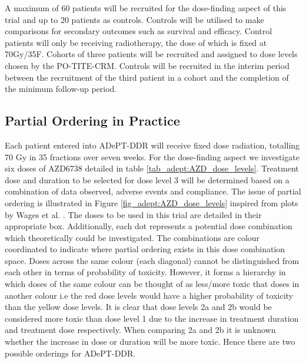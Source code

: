 A maximum of 60 patients will be recruited for the dose-finding aspect of this trial and up to 20 patients as controls. Controls will be utilised to make comparisons for secondary outcomes such as survival and efficacy. Control patients will only be receiving radiotherapy, the dose of which is fixed at 70Gy/35F. Cohorts of three patients will be recruited and assigned to dose levels chosen by the PO-TITE-CRM. Controls will be recruited in the interim period between the recruitment of the third patient in a cohort and the completion of the minimum follow-up period.    

\subsection{Partial Ordering in Practice}
\label{adept:Partial-ordering-in-practice}%

Each patient entered into ADePT-DDR will receive fixed dose radiation, totalling 70 Gy in 35 fractions over seven weeks. For the dose-finding aspect we investigate six doses of AZD6738 detailed in table \ref{tab_adept:AZD_dose_levels}. Treatment dose and duration to be selected for dose level 3 will be determined based on a combination of data observed, adverse events and compliance. The issue of partial ordering is illustrated in Figure \ref{fig_adept:AZD_dose_levels} inspired from plots by Wages et al. \cite{wagesUsingTimetoeventContinual2013}. The doses to be used in this trial are detailed in their appropriate box. Additionally, each dot represents a potential dose combination which theoretically could be investigated. The combinations are colour coordinated to indicate where partial ordering exists in this dose combination space. Doses across the same colour (each diagonal) cannot be distinguished from each other in terms of probability of toxicity. However, it forms a hierarchy in which doses of the same colour can be thought of as less/more toxic that doses in another colour i.e the red dose levels would have a higher probability of toxicity than the yellow dose levels. It is clear that dose levels 2a and 2b would be considered more toxic than dose level 1 due to the increase in treatment duration and treatment dose respectively. When comparing 2a and 2b it is unknown whether the increase in dose or duration will be more toxic. Hence there are two possible orderings for ADePT-DDR. 

